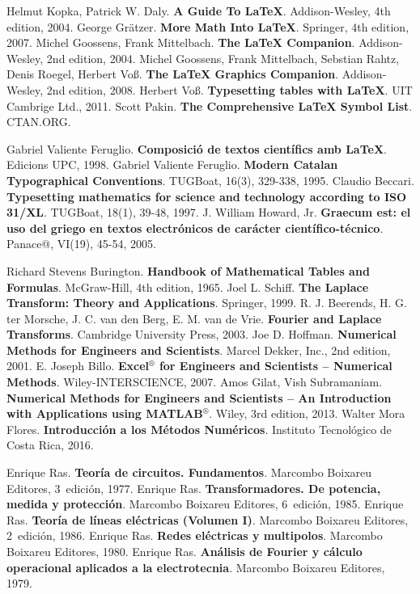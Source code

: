 \begin{thebibliography}{99}


     Helmut Kopka, Patrick W. Daly. \textbf{A Guide To \LaTeX}.  Addison-Wesley, 4th edition, 2004.
     George Grätzer. \textbf{More Math Into \LaTeX}.  Springer, 4th edition, 2007.
     Michel Goossens, Frank Mittelbach. \textbf{The \LaTeX{} Companion}.  Addison-Wesley, 2nd edition, 2004.
     Michel Goossens, Frank Mittelbach, Sebstian Rahtz, Denis Roegel, Herbert Voß. \textbf{The \LaTeX{} Graphics Companion}.  Addison-Wesley, 2nd edition, 2008.
     Herbert Voß. \textbf{Typesetting tables with \LaTeX{}}.  UIT Cambrige Ltd., 2011.
     Scott Pakin. \textbf{The Comprehensive \LaTeX{} Symbol List}. CTAN.ORG.

     Gabriel Valiente Feruglio. \textbf{Composició de textos científics amb \LaTeX}.  Edicions UPC, 1998.
     Gabriel Valiente Feruglio. \textbf{Modern Catalan Typographical Conventions}.  TUGBoat, 16(3), 329-338, 1995.
     Claudio Beccari. \textbf{Typesetting mathematics for science and technology according to ISO 31/XL}.  TUGBoat, 18(1), 39-48, 1997.
     J. William Howard, Jr. \textbf{Graecum est: el uso del griego en textos electrónicos de carácter científico-técnico}.  Panace@, VI(19), 45-54, 2005.

     Richard Stevens Burington. \textbf{Handbook of Mathematical Tables and Formulas}.  McGraw-Hill, 4th edition, 1965.
     Joel L. Schiff. \textbf{The Laplace Transform: Theory and Applications}.  Springer, 1999.
     R. J. Beerends, H. G. ter Morsche, J. C. van den Berg, E. M. van de Vrie. \textbf{Fourier and Laplace Transforms}.  Cambridge University Press, 2003.
     Joe D. Hoffman. \textbf{Numerical Methods for Engineers and Scientists}.  Marcel Dekker, Inc., 2nd edition, 2001.
     E. Joseph Billo. \textbf{Excel${}^\circledR$ for Engineers and Scientists -- Numerical Methods}.  Wiley-INTERSCIENCE, 2007.
     Amos Gilat, Vish Subramaniam. \textbf{Numerical Methods for Engineers and Scientists --
        An Introduction with Applications using MATLAB${}^\circledR$}.  Wiley, 3rd edition, 2013.
     Walter Mora Flores. \textbf{Introducción a los Métodos Numéricos}.  Instituto Tecnológico de Costa Rica, 2016.

     Enrique Ras. \textbf{Teoría de circuitos. Fundamentos}.  Marcombo Boixareu Editores, 3\textordfeminine\ edición, 1977.
     Enrique Ras. \textbf{Transformadores. De potencia, medida y protección}.  Marcombo Boixareu Editores, 6\textordfeminine\ edición, 1985.
     Enrique Ras. \textbf{Teoría de líneas eléctricas (Volumen I)}.  Marcombo Boixareu Editores, 2\textordfeminine\ edición, 1986.
     Enrique Ras. \textbf{Redes eléctricas y multipolos}.  Marcombo Boixareu Editores, 1980.
     Enrique Ras. \textbf{Análisis de Fourier y cálculo operacional aplicados a la electrotecnia}.  Marcombo Boixareu Editores, 1979.


\end{thebibliography}
